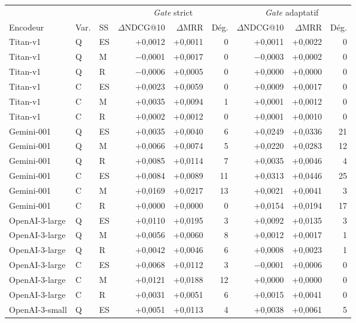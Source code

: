 \documentclass[a4paper,10pt]{article}
\begin{document}
\begin{table}[p]
\centering
\small
\begin{tabular}{lllrrrrrr}
\toprule
 & & & \multicolumn{3}{c}{\textit{Gate} strict} & \multicolumn{3}{c}{\textit{Gate} adaptatif} \\
\cmidrule(lr){4-6}\cmidrule(lr){7-9}
Encodeur & Var. & SS & $\Delta$NDCG@10 & $\Delta$MRR & Dég. & $\Delta$NDCG@10 & $\Delta$MRR & Dég. \\
\midrule
Titan-v1 & Q & ES & +0,0012 & +0,0011 & 0 & +0,0011 & +0,0022 & 0 \\
Titan-v1 & Q & M & $-$0,0001 & +0,0017 & 0 & $-$0,0003 & +0,0002 & 0 \\
Titan-v1 & Q & R & $-$0,0006 & +0,0005 & 0 & +0,0000 & +0,0000 & 0 \\
Titan-v1 & C & ES & +0,0023 & +0,0059 & 0 & +0,0009 & +0,0017 & 0 \\
Titan-v1 & C & M & +0,0035 & +0,0094 & 1 & +0,0001 & +0,0012 & 0 \\
Titan-v1 & C & R & +0,0002 & +0,0012 & 0 & +0,0001 & +0,0010 & 0 \\
\midrule
Gemini-001 & Q & ES & +0,0035 & +0,0040 & 6 & +0,0249 & +0,0336 & 21 \\
Gemini-001 & Q & M & +0,0066 & +0,0074 & 5 & +0,0220 & +0,0283 & 12 \\
Gemini-001 & Q & R & +0,0085 & +0,0114 & 7 & +0,0035 & +0,0046 & 4 \\
Gemini-001 & C & ES & +0,0084 & +0,0089 & 11 & +0,0313 & +0,0446 & 25 \\
Gemini-001 & C & M & +0,0169 & +0,0217 & 13 & +0,0021 & +0,0041 & 3 \\
Gemini-001 & C & R & +0,0000 & +0,0000 & 0 & +0,0154 & +0,0194 & 17 \\
\midrule
OpenAI-3-large & Q & ES & +0,0110 & +0,0195 & 3 & +0,0092 & +0,0135 & 3 \\
OpenAI-3-large & Q & M & +0,0056 & +0,0060 & 8 & +0,0012 & +0,0017 & 1 \\
OpenAI-3-large & Q & R & +0,0042 & +0,0046 & 6 & +0,0008 & +0,0023 & 1 \\
OpenAI-3-large & C & ES & +0,0068 & +0,0112 & 3 & $-$0,0001 & +0,0006 & 0 \\
OpenAI-3-large & C & M & +0,0121 & +0,0188 & 12 & +0,0000 & +0,0000 & 0 \\
OpenAI-3-large & C & R & +0,0031 & +0,0051 & 6 & +0,0015 & +0,0041 & 0 \\
\midrule
OpenAI-3-small & Q & ES & +0,0051 & +0,0113 & 4 & +0,0038 & +0,0061 & 5 \\

\end{tabular}
\end{table}
\end{document}

